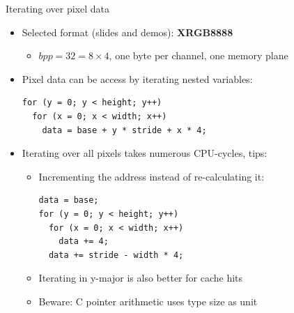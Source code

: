 \begin{frame}[fragile]{Iterating over pixel data}
  \begin{itemize}
  \item Selected format (slides and demos): \textbf{XRGB8888}
    \begin{itemize}
    \item \(bpp = 32 = 8 \times 4\), one byte per channel, one memory plane
    \end{itemize}
  \item Pixel data can be access by iterating nested variables:
  \begin{verbatim}
for (y = 0; y < height; y++)
  for (x = 0; x < width; x++)
    data = base + y * stride + x * 4;
  \end{verbatim}
  \item Iterating over all pixels takes numerous CPU-cycles, tips:
    \begin{itemize}
    \item Incrementing the address instead of re-calculating it:
  \begin{verbatim}
data = base;
for (y = 0; y < height; y++)
  for (x = 0; x < width; x++)
    data += 4;
  data += stride - width * 4;
  \end{verbatim}
    \item Iterating in y-major is also better for cache hits
    \item Beware: C pointer arithmetic uses type size as unit
    \end{itemize}
  \end{itemize}
\end{frame}

